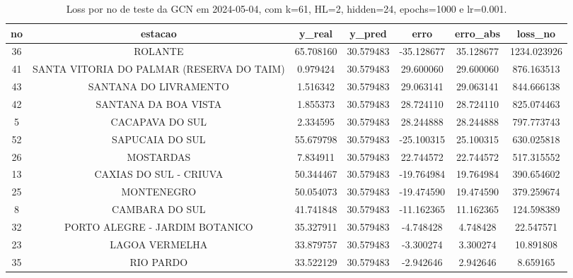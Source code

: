 \begin{table}[h]
\centering
\caption{Loss por no de teste da GCN em 2024-05-04, com k=61, HL=2, hidden=24, epochs=1000 e lr=0.001.}
\label{tab:gcn_loss_k61_hl2_h24_e1000_d20240504}
\begin{tabular}{ccccccc}
\toprule
no & estacao & y\_real & y\_pred & erro & erro\_abs & loss\_no \\
\midrule
36 & ROLANTE & 65.708160 & 30.579483 & -35.128677 & 35.128677 & 1234.023926 \\
41 & SANTA VITORIA DO PALMAR (RESERVA DO TAIM) & 0.979424 & 30.579483 & 29.600060 & 29.600060 & 876.163513 \\
43 & SANTANA DO LIVRAMENTO & 1.516342 & 30.579483 & 29.063141 & 29.063141 & 844.666138 \\
42 & SANTANA DA BOA VISTA & 1.855373 & 30.579483 & 28.724110 & 28.724110 & 825.074463 \\
5 & CACAPAVA DO SUL & 2.334595 & 30.579483 & 28.244888 & 28.244888 & 797.773743 \\
52 & SAPUCAIA DO SUL & 55.679798 & 30.579483 & -25.100315 & 25.100315 & 630.025818 \\
26 & MOSTARDAS & 7.834911 & 30.579483 & 22.744572 & 22.744572 & 517.315552 \\
13 & CAXIAS DO SUL - CRIUVA & 50.344467 & 30.579483 & -19.764984 & 19.764984 & 390.654602 \\
25 & MONTENEGRO & 50.054073 & 30.579483 & -19.474590 & 19.474590 & 379.259674 \\
8 & CAMBARA DO SUL & 41.741848 & 30.579483 & -11.162365 & 11.162365 & 124.598389 \\
32 & PORTO ALEGRE - JARDIM BOTANICO & 35.327911 & 30.579483 & -4.748428 & 4.748428 & 22.547571 \\
23 & LAGOA VERMELHA & 33.879757 & 30.579483 & -3.300274 & 3.300274 & 10.891808 \\
35 & RIO PARDO & 33.522129 & 30.579483 & -2.942646 & 2.942646 & 8.659165 \\
\bottomrule
\end{tabular}
\end{table}
